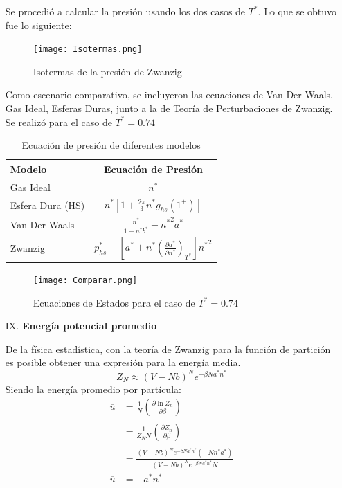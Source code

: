 \documentclass[12pt,letterpaper]{article}
\newcommand{\pd}[3] {\left(\frac{\partial #1}{\partial #2}\right)_{#3}}
\begin{document}
\begin{enumerate}
Se procedió a calcular la presión usando los dos casos de $T^*$. Lo que se obtuvo fue lo siguiente:
\begin{figure}[H]
	\centering
	\texttt{[image: Isotermas.png]}
	\caption{Isotermas de la presión de Zwanzig}
\end{figure}
Como escenario comparativo, se incluyeron las ecuaciones de Van Der Waals, Gas Ideal, Esferas Duras, junto a la de Teoría de Perturbaciones de Zwanzig. Se realizó para el caso de $T^*=0.74$
\begin{table}[H]
\centering
\begin{tabular}{|l|c|}
\hline 
Modelo & Ecuación de Presión \\ \hline 
Gas Ideal & $n^*$ \\ \hline 
Esfera Dura (HS) & $n^* \left[  1+\frac{2\pi}{3} n^* g_{hs}(1^+) \right] $\\ \hline 
Van Der Waals &  $\frac{n^*}{1-n^*b^*} - {n^*}^2a^*$ \\ \hline 
Zwanzig & $ p^*_{hs} - \left[ a^* + n^* \left(\frac{\partial a^*}{\partial n^*}\right)_{T^*} \right] {n^*}^2 $ \\ \hline 
\end{tabular} 
\caption{Ecuación de presión de diferentes modelos}
\end{table}
\begin{figure}[H]
	\centering 
	\texttt{[image: Comparar.png]}
	\caption{Ecuaciones de Estados para el caso de $T^*=0.74$}
	\label{Fig:EcEst_Compara}
\end{figure}

\item[IX.]\textbf{Energía potencial promedio}

De la física estadística, con la teoría de Zwanzig para la función de partición es posible obtener una expresión para la energía media.
\begin{equation}
	Z_N \approx \left( V-Nb\right)^N e^{-\beta N a^*n^*}
\end{equation}
Siendo la energía promedio por partícula:
\begin{align}
	\overline{u} &= \frac{1}{N} \pd{\ln Z_n}{\beta}{} \nonumber\\
	&= \frac{1}{Z_N N} \pd{Z_n}{\beta}{} \nonumber \\
	&= \frac{ \left( V-Nb\right)^N e^{-\beta N a^*n^*} \left(-Nn^*a^*\right)  }{\left( V-Nb\right)^N e^{-\beta N a^*n^*} N}  \nonumber \\
	\overline{u} &= -a^*n^* \label{EnergiaPromedio}
\end{align}


\end{enumerate}
\end{document}
